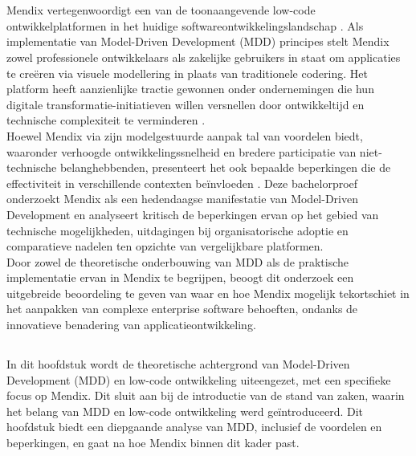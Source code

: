 \chapter{}%
\label{ch:stand-van-zaken}

Mendix vertegenwoordigt een van de toonaangevende low-code ontwikkelplatformen in het huidige softwareontwikkelingslandschap \autocite{Hermans2023}. Als implementatie van Model-Driven Development (MDD) principes stelt Mendix zowel professionele ontwikkelaars als zakelijke gebruikers in staat om applicaties te creëren via visuele modellering in plaats van traditionele codering. Het platform heeft aanzienlijke tractie gewonnen onder ondernemingen die hun digitale transformatie-initiatieven willen versnellen door ontwikkeltijd en technische complexiteit te verminderen \autocite{Oosten2020}.
\\
Hoewel Mendix via zijn modelgestuurde aanpak tal van voordelen biedt, waaronder verhoogde ontwikkelingssnelheid en bredere participatie van niet-technische belanghebbenden, presenteert het ook bepaalde beperkingen die de effectiviteit in verschillende contexten beïnvloeden \autocite{Yerukala2022}. Deze bachelorproef onderzoekt Mendix als een hedendaagse manifestatie van Model-Driven Development en analyseert kritisch de beperkingen ervan op het gebied van technische mogelijkheden, uitdagingen bij organisatorische adoptie en comparatieve nadelen ten opzichte van vergelijkbare platformen.
\\
Door zowel de theoretische onderbouwing van MDD als de praktische implementatie ervan in Mendix te begrijpen, beoogt dit onderzoek een uitgebreide beoordeling te geven van waar en hoe Mendix mogelijk tekortschiet in het aanpakken van complexe enterprise software behoeften, ondanks de innovatieve benadering van applicatieontwikkeling.
\newpage

\section{}%
In dit hoofdstuk wordt de theoretische achtergrond van Model-Driven Development (MDD) en low-code ontwikkeling uiteengezet, met een specifieke focus op Mendix. Dit sluit aan bij de introductie van de stand van zaken, waarin het belang van MDD en low-code ontwikkeling werd geïntroduceerd. Dit hoofdstuk biedt een diepgaande analyse van MDD, inclusief de voordelen en beperkingen, en gaat na hoe Mendix binnen dit kader past.

